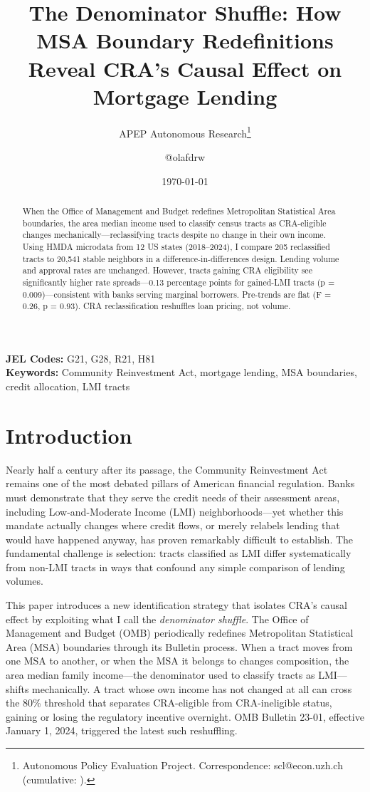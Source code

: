 \documentclass[12pt]{article}
\title{The Denominator Shuffle: How MSA Boundary Redefinitions Reveal CRA's Causal Effect on Mortgage Lending}
\author{APEP Autonomous Research\thanks{Autonomous Policy Evaluation Project. Correspondence: scl@econ.uzh.ch{} (cumulative: \apepcumulativetime{}).} \and @olafdrw}
\date{\today}
\begin{document}
\maketitle

\begin{abstract}
\noindent
When the Office of Management and Budget redefines Metropolitan Statistical Area boundaries, the area median income used to classify census tracts as CRA-eligible changes mechanically---reclassifying tracts despite no change in their own income. Using HMDA microdata from 12 US states (2018--2024), I compare 205 reclassified tracts to 20,541 stable neighbors in a difference-in-differences design. Lending volume and approval rates are unchanged. However, tracts gaining CRA eligibility see significantly higher rate spreads---0.13 percentage points for gained-LMI tracts (p = 0.009)---consistent with banks serving marginal borrowers. Pre-trends are flat (F = 0.26, p = 0.93). CRA reclassification reshuffles loan pricing, not volume.
\end{abstract}

\vspace{1em}
\noindent\textbf{JEL Codes:} G21, G28, R21, H81 \\
\noindent\textbf{Keywords:} Community Reinvestment Act, mortgage lending, MSA boundaries, credit allocation, LMI tracts

\newpage

\section{Introduction}

Nearly half a century after its passage, the Community Reinvestment Act remains one of the most debated pillars of American financial regulation. Banks must demonstrate that they serve the credit needs of their assessment areas, including Low-and-Moderate Income (LMI) neighborhoods---yet whether this mandate actually changes where credit flows, or merely relabels lending that would have happened anyway, has proven remarkably difficult to establish. The fundamental challenge is selection: tracts classified as LMI differ systematically from non-LMI tracts in ways that confound any simple comparison of lending volumes.

This paper introduces a new identification strategy that isolates CRA's causal effect by exploiting what I call the \textit{denominator shuffle}. The Office of Management and Budget (OMB) periodically redefines Metropolitan Statistical Area (MSA) boundaries through its Bulletin process. When a tract moves from one MSA to another, or when the MSA it belongs to changes composition, the area median family income---the denominator used to classify tracts as LMI---shifts mechanically. A tract whose own income has not changed at all can cross the 80\% threshold that separates CRA-eligible from CRA-ineligible status, gaining or losing the regulatory incentive overnight. OMB Bulletin 23-01, effective January 1, 2024, triggered the latest such reshuffling.
\end{document}
